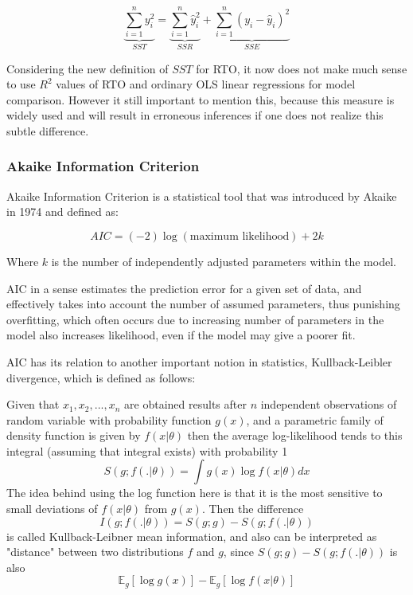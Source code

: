 \documentclass[12pt,a4paper,oneside]{book} %
\newcommand{\E}{\mathbb{E}}
\begin{document}
	$$\underbrace{\sum_{i=1}^{n} y_i^2}_{SST} = \underbrace{\sum_{i=1}^{n} \hat{y}_i^2}_{SSR} + \underbrace{\sum_{i=1}^{n} (y_i - \hat{y}_i)^2}_{SSE}$$
	
	Considering the new definition of $SST$ for RTO, it now does not make much sense to use $R^2$ values of RTO and ordinary OLS linear regressions for model comparison. However it still important to mention this, because this measure is widely used and will result in erroneous inferences if one does not realize this subtle difference.

\subsubsection{Akaike Information Criterion}

Akaike Information Criterion is a statistical tool that was introduced by Akaike in 1974 \cite{akaike1974new} and defined as:

\begin{equation*}
	AIC = (-2) \log (\text{maximum likelihood}) + 2 k
\end{equation*}

Where $k$ is the number of independently adjusted parameters within the model.

AIC in a sense estimates the prediction error for a given set of data, and effectively takes into account the number of assumed parameters, thus punishing overfitting, which often occurs due to increasing number of parameters in the model also increases likelihood, even if the model may give a poorer fit.

AIC has its relation to another important notion in statistics, Kullback-Leibler divergence, which is defined as follows:

Given that $x_1, x_2, ..., x_n$ are obtained results after $n$ independent observations of random variable with probability function $g(x)$, and a parametric family of density function is given by $f(x| \theta )$ then the average log-likelihood tends to this integral (assuming that integral exists) with probability 1
\begin{equation}
	S(g; f(.| \theta)) = \int g(x) \log f(x| \theta)dx
\end{equation}
The idea behind using the log function here is that it is the most sensitive to small deviations of $f(x| \theta)$ from $g(x)$. 
Then the difference 
\begin{equation*}
	I(g; f(.|\theta)) = S(g;g) - S(g; f(.|\theta))
\end{equation*}
is called Kullback-Leibner mean information, and also can be interpreted as "distance" between two distributions $f$ and $g$, since $S(g;g) - S(g; f(.|\theta))$ is also 
\[
	\E_{g} [\log g(x)] - \E_{g} [\log f(x|\theta)]
\]
\end{document}
